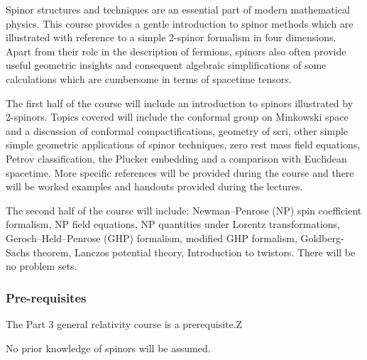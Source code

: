 \documentclass[a4paper]{article}
\begin{document}
\maketitle
{\small
\setlength{\parindent}{0em}
\setlength{\parskip}{1em}
Spinor structures and techniques are an essential part of modern mathematical physics. This course provides a gentle introduction to spinor methods which are illustrated with reference to a simple 2-spinor formalism in four dimensions. Apart from their role in the description of fermions, spinors also often provide useful geometric insights and consequent algebraic simplifications of some calculations which are cumbersome in terms of spacetime tensors.

The first half of the course will include an introduction to spinors illustrated by 2-spinors. Topics covered will include the conformal group on Minkowski space and a discussion of conformal compactifications, geometry of scri, other simple simple geometric applications of spinor techniques, zero rest mass field equations, Petrov classification, the Plucker embedding and a comparison with Euclidean spacetime. More specific references will be provided during the course and there will be worked examples and handouts provided during the lectures.

The second half of the course will include: Newman--Penrose (NP) spin coefficient formalism, NP field equations, NP quantities under Lorentz transformations, Geroch--Held--Penrose (GHP) formalism, modified GHP formalism, Goldberg-Sachs theorem, Lanczos potential theory, Introduction to twistors. There will be no problem sets.
\subsubsection*{Pre-requisites}
The Part 3 general relativity course is a prerequisite.Z

No prior knowledge of spinors will be assumed.
}
\tableofcontents

\printindex
\end{document}
